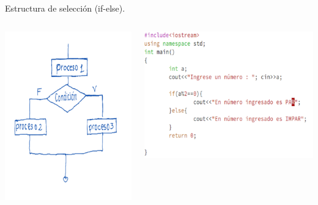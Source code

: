 \documentclass[presentation, aspectratio=54]{beamer}
\begin{document}
\begin{frame}[label={sec:org519cd54}]{Estructura de selección (if-else).}
\begin{columns}
\begin{column}{0.4\columnwidth}
\begin{center}
\includegraphics[width=.9\linewidth]{./images/codigo/ifsino.png}
\end{center}
\end{column}
\begin{column}{0.6\columnwidth}
\begin{center}
\includegraphics[width=.9\linewidth]{./images/codigo/code-ifsino.png}
\end{center}
\end{column}
\end{columns}
\end{frame}
\end{document}
